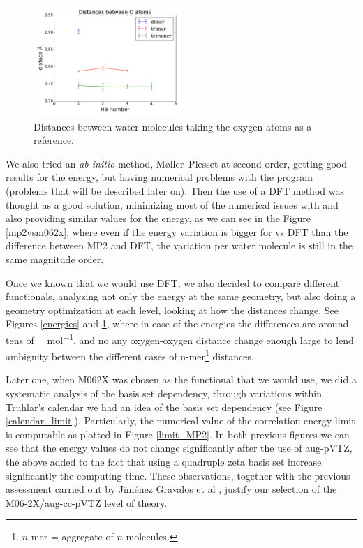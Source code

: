 \begin{figure} %
    \centering
\vspace*{-1cm}
    \includegraphics[width=0.5\textwidth]{4/plots/theory_level/distances.pdf}
    \caption{Distances between water molecules taking the oxygen atoms as a reference.}
    \label{distances}
\end{figure}

We also tried an \textit{ab initio} method, Møller–Plesset at second
order, getting good results for the energy, but having numerical problems with the
{} program (problems that will be described later on). Then the use
of a DFT method was thought as a good solution, minimizing most of the numerical
issues with {} and also providing similar values for the energy, as
we can see in the Figure \ref{mp2vsm062x}, where even if the energy variation
is bigger for {} vs DFT than the difference between MP2 and DFT,
the variation per water molecule is still in the same magnitude order.

\newpage

Once we known that we would use DFT, we also decided to compare different
functionals, analyzing not only the energy at the same geometry, but also doing
a geometry optimization at each level, looking at how the distances change.
See Figures \ref{energies} and \ref{distances}, where in case of the energies
the differences are around tens of \si{\kilo\calorie\per\mole}, and no any oxygen-oxygen
distance change enough large to lend ambiguity between the
different cases of \gls{n-mer}\footnote{$n$-mer
= aggregate of $n$ molecules.} distances.

Later one, when M062X was chosen as the functional that we would use, we did a
systematic analysis of the basis set dependency, through variations within
Truhlar’s calendar \cite{Papajak2011} we had an idea of the basis set
dependency (see Figure \ref{calendar_limit}). Particularly, the numerical value
of the correlation energy limit is computable as plotted in Figure
\ref{limit_MP2}. In both previous figures we can see that the energy values do
not change significantly after the use of aug-pVTZ, the above added to the fact
that using a quadruple zeta basis set increase significantly the computing time.
These observations, together with the previous assessment carried out by
Jiménez Gravalos et al , justify our selection of
the M06-2X/aug-cc-pVTZ level of theory. 

